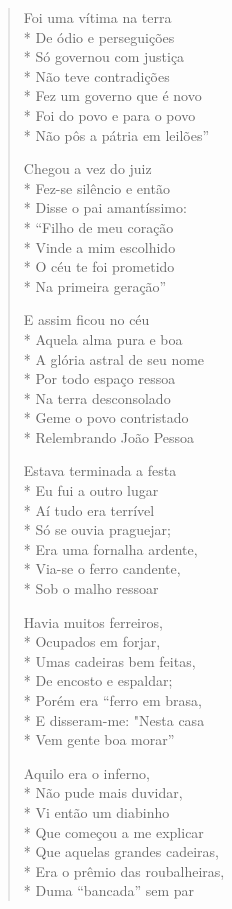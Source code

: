 \begin{verse}
Foi uma vítima na terra\\*
De ódio e perseguições\\*
Só governou com justiça\\*
Não teve contradições\\*
Fez um governo que é novo\\*
Foi do povo e para o povo\\*
Não pôs a pátria em leilões''

Chegou a vez do juiz\\*
Fez-se silêncio e então\\*
Disse o pai amantíssimo:\\*
``Filho de meu coração\\*
Vinde a mim escolhido\\*
O céu te foi prometido\\*
Na primeira geração''

E assim ficou no céu\\*
Aquela alma pura e boa\\*
A glória astral de seu nome\\*
Por todo espaço ressoa\\*
Na terra desconsolado\\*
Geme o povo contristado\\*
Relembrando João Pessoa

Estava terminada a festa\\*
Eu fui a outro lugar\\*
Aí tudo era terrível\\*
Só se ouvia praguejar;\\*
Era uma fornalha ardente,\\*
Via-se o ferro candente,\\*
Sob o malho ressoar

Havia muitos ferreiros,\\*
Ocupados em forjar,\\*
Umas cadeiras bem feitas,\\*
De encosto e espaldar;\\*
Porém era ``ferro em brasa,\\*
E disseram-me: "Nesta casa\\*
Vem gente boa morar''

Aquilo era o inferno,\\*
Não pude mais duvidar,\\*
Vi então um diabinho\\*
Que começou a me explicar\\*
Que aquelas grandes cadeiras,\\*
Era o prêmio das roubalheiras,\\*
Duma ``bancada'' sem par


\end{verse}
